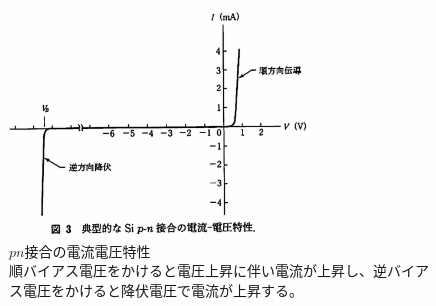 \begin{figure}[h]
    \centering
    \includegraphics[width=8cm]{fig/ch2/IV.jpg}
    \caption[$pn$接合の電流電圧特性\cite{sze2012semiconductor}]{$pn$接合の電流電圧特性\cite{sze2012semiconductor}\\順バイアス電圧をかけると電圧上昇に伴い電流が上昇し、逆バイアス電圧をかけると降伏電圧で電流が上昇する。}
    \label{fg:IV}
\end{figure}



